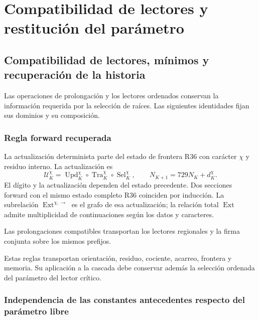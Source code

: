\section{Compatibilidad de lectores y restitución del parámetro}
\label{hmtfg:fragmento:compatibilidad-de-lectores-y-restitucion-del-parametro}

\subsection{Compatibilidad de lectores, mínimos y recuperación de la historia}
\label{hmtfg:escalado:13}

Las operaciones de prolongación y los lectores ordenados conservan la información requerida por la selección de raíces. Las siguientes identidades fijan sus dominios y su composición.

\subsubsection{Regla forward recuperada}
\label{hmtfg:escalado:13.1}

La actualización determinista parte del estado de frontera R36 con carácter \(\chi\) y residuo interno. La actualización es
\begin{equation}
\mathcal U_K^\chi=
\operatorname{Upd}_K^\chi\circ
\operatorname{Tra}_K^\chi\circ
\operatorname{Sel}_K^\chi,
\qquad
N_{K+1}=729N_K+d_K^\chi.
\label{hmtfg:escalado:eq:26}
\end{equation}
El dígito y la actualización dependen del estado precedente. Dos secciones forward con el mismo estado completo R36 coinciden por inducción. La subrelación \(\operatorname{Ext}^{\chi,\rightarrow}\) es el grafo de esa actualización; la relación total \(\operatorname{Ext}\) admite multiplicidad de continuaciones según los datos y caracteres.

Las prolongaciones compatibles transportan los lectores regionales y la firma conjunta sobre los mismos prefijos.

Estas reglas transportan orientación, residuo, cociente, acarreo, frontera y memoria. Su aplicación a la cascada debe conservar además la selección ordenada del parámetro del lector crítico.

\subsubsection{Independencia de las constantes antecedentes respecto del parámetro libre}
\label{hmtfg:escalado:13.2}

